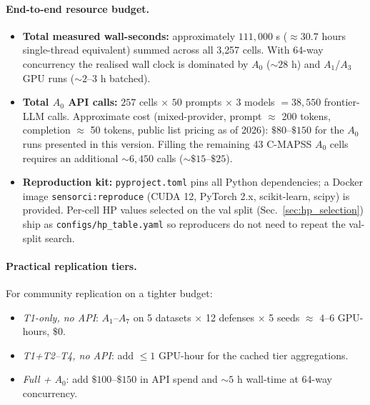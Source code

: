 \documentclass{article}
\theoremstyle{remark}
\begin{document}
\paragraph{End-to-end resource budget.}
\begin{itemize}
\item \textbf{Total measured wall-seconds:} approximately $111{,}000$ s ($\approx$$30.7$ hours single-thread equivalent) summed across all 3{,}257 cells. With 64-way concurrency the realised wall clock is dominated by $A_0$ ($\sim$$28$ h) and $A_1$/$A_3$ GPU runs ($\sim$$2$--$3$ h batched).
\item \textbf{Total $A_0$ API calls:} $257$ cells $\times$ $50$ prompts $\times$ $3$ models $= 38{,}550$ frontier-LLM calls. Approximate cost (mixed-provider, prompt $\approx$ 200 tokens, completion $\approx$ 50 tokens, public list pricing as of 2026): $\$80$--$\$150$ for the $A_0$ runs presented in this version. Filling the remaining 43 C-MAPSS $A_0$ cells requires an additional $\sim$$6{,}450$ calls ($\sim$$\$15$--$\$25$).
\item \textbf{Reproduction kit:} \texttt{pyproject.toml} pins all Python dependencies; a Docker image \texttt{sensorci:reproduce} (CUDA 12, PyTorch 2.x, scikit-learn, scipy) is provided. Per-cell HP values selected on the val split (Sec.~\ref{sec:hp_selection}) ship as \texttt{configs/hp\_table.yaml} so reproducers do not need to repeat the val-split search.
\end{itemize}

\paragraph{Practical replication tiers.} For community replication on a tighter budget:
\begin{itemize}
\item \emph{T1-only, no API}: $A_1$--$A_7$ on 5 datasets $\times$ 12 defenses $\times$ 5 seeds $\approx$ $4$--$6$ GPU-hours, $\$0$.
\item \emph{T1+T2--T4, no API}: add $\le 1$ GPU-hour for the cached tier aggregations.
\item \emph{Full + $A_0$}: add $\$100$--$\$150$ in API spend and $\sim$$5$ h wall-time at 64-way concurrency.
\end{itemize}
\end{document}
